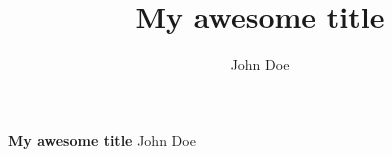 \documentclass[14pt]{article}
\title{My awesome title}
\author{John Doe}
\date{}
\numberwithin{equation}{section}
\theoremstyle{henrique}
\begin{document}
\begin{center}
\Large{\textbf{My awesome title}}
John Doe
\end{center}

\tableofcontents
\end{document}
